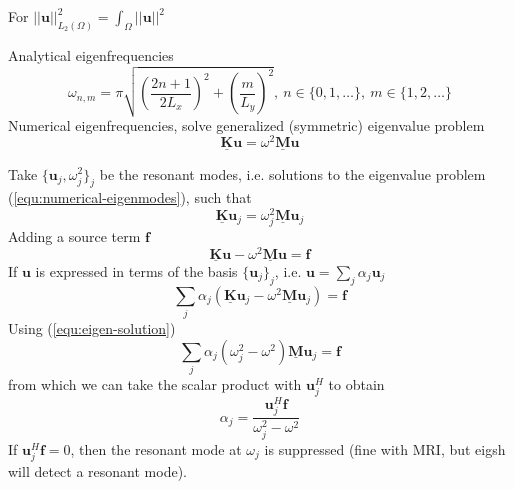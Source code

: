 \documentclass[11pt, a4paper]{article}
\begin{document}

For $||\mathbf{u}||_{L_2(\Omega)}^2 = \int_{\Omega} ||\mathbf{u}||^2$

Analytical eigenfrequencies
\begin{equation}
    \omega_{n, m} = \pi \sqrt{\left(\frac{2n + 1}{2L_x}\right)^2 + \left(\frac{m}{L_y}\right)^2},
    ~n \in \{0, 1, \dots\}, ~m \in \{1, 2, \dots \} \label{equ:analytical-eigenmodes}
\end{equation}
Numerical eigenfrequencies, solve generalized (symmetric) eigenvalue problem
\begin{equation}
    \mathbf{\underline{K}} \mathbf{u} = \omega^2 \mathbf{\underline{M}} \mathbf{u}
    \label{equ:numerical-eigenmodes}
\end{equation}

Take $\{ \mathbf{u}_j, \omega_j^2 \}_j$ be the resonant modes, i.e. solutions to 
the eigenvalue problem (\ref{equ:numerical-eigenmodes}), such that
\begin{equation}
    \mathbf{\underline{K}} \mathbf{u}_j = \omega_j^2 \mathbf{\underline{M}} \mathbf{u}_j
    \label{equ:eigen-solution}
\end{equation}
Adding a source term $\mathbf{f}$ 
\begin{equation}
    \mathbf{\underline{K}} \mathbf{u} - \omega^2 \mathbf{\underline{M}} \mathbf{u} = \mathbf{f}
\end{equation}
If $\mathbf{u}$ is expressed in terms of the basis $\{ \mathbf{u}_j \}_j$, i.e.
$\mathbf{u} = \sum_j \alpha_j \mathbf{u}_j$
\begin{equation}
    \sum_j \alpha_j (\mathbf{\underline{K}} \mathbf{u}_j - \omega^2 \mathbf{\underline{M}} \mathbf{u}_j) = \mathbf{f}
\end{equation}
Using (\ref{equ:eigen-solution})
\begin{equation}
    \sum_j \alpha_j (\omega_j^2 - \omega^2) \mathbf{\underline{M}} \mathbf{u}_j = \mathbf{f}
\end{equation}
from which we can take the scalar product with $\mathbf{u}_j^H$ to obtain
\begin{equation}
    \alpha_j = \frac{\mathbf{u}_j^H \mathbf{f}}{\omega_j^2 - \omega^2}
\end{equation}
If $\mathbf{u}_j^H \mathbf{f} = 0$, then the resonant mode at $\omega_j$ is 
suppressed (fine with MRI, but eigsh will detect a resonant mode).
\end{document}
